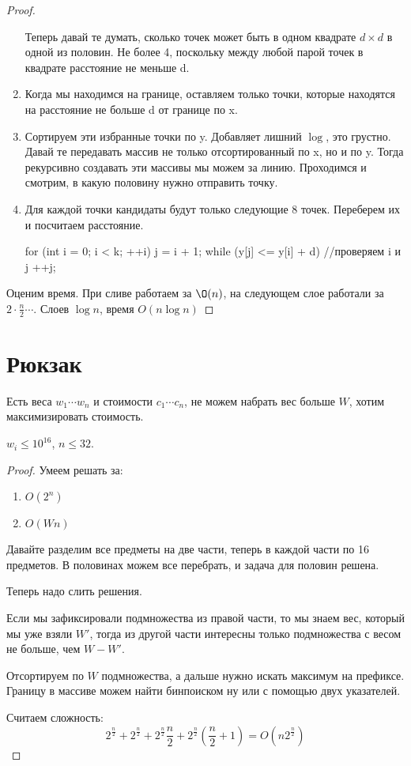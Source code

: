 \begin{proof}
\begin{enumerate}
       Теперь давай те думать, сколько точек может быть в одном квадрате $d \times d$ в одной из половин. Не более 4, поскольку между
       любой парой точек в квадрате расстояние не меньше d.
       \item
       Когда мы находимся на границе, оставляем только точки, которые находятся на расстояние не больше d от границе  по x.
       \item
       Сортируем эти избранные точки по y. Добавляет лишний $\log$, это грустно. Давай те передавать массив не только
       отсортированный по x, но и по y. Тогда рекурсивно создавать эти массивы мы можем за линию. Проходимся и смотрим, в какую половину нужно
       отправить точку. 
       \item
       Для каждой точки кандидаты будут только следующие 8 точек. Переберем их и посчитаем расстояние.  
       \begin{cppcode}
       for (int i = 0; i < k; ++i) {
           j = i + 1;
           while (y[j] <= y[i] + d) {
               //проверяем i и j
               ++j;
           }
       }
       \end{cppcode}
       \end{enumerate}
        Оценим время. При сливе работаем за $\O(n)$, на следующем слое работали за $2 \cdot \frac{n}{2} \cdots$. 
        Слоев $\log n$, время $O(n \log n)$

    \end{proof}
\section{Рюкзак}
 Есть веса $w_1 \cdots w_n$ и стоимости $c_1 \cdots c_n$, не можем набрать вес больше $W$, хотим 
максимизировать стоимость. 

$w_i \le 10^{16}$, $n \le 32$.
\begin{proof}
Умеем решать за:
   \begin{enumerate}
   \item $O(2^n)$
   \item $O(Wn)$
   \end{enumerate}

Давайте разделим все предметы на две части, теперь в каждой части по 16 предметов. В половинах можем все перебрать, и задача для половин решена.

Теперь надо слить решения.

Если мы зафиксировали подмножества из правой части, то мы знаем вес, который мы уже взяли $W'$, тогда из другой части интересны только
подмножества с весом не больше, чем $W - W'$.

Отсортируем по $W$ подмножества, а дальше нужно искать максимум на префиксе. Границу в массиве можем найти бинпоиском ну или с помощью двух указателей.

Считаем сложность: 
$$2^{\frac{n}{2}} + 2^{\frac{n}{2}} + 2^{\frac{n}{2}} \frac{n}{2} + 2^{\frac{n}{2}}(\frac{n}{2} + 1) = O(n 2^\frac{n}{2})$$   
\end{proof}
